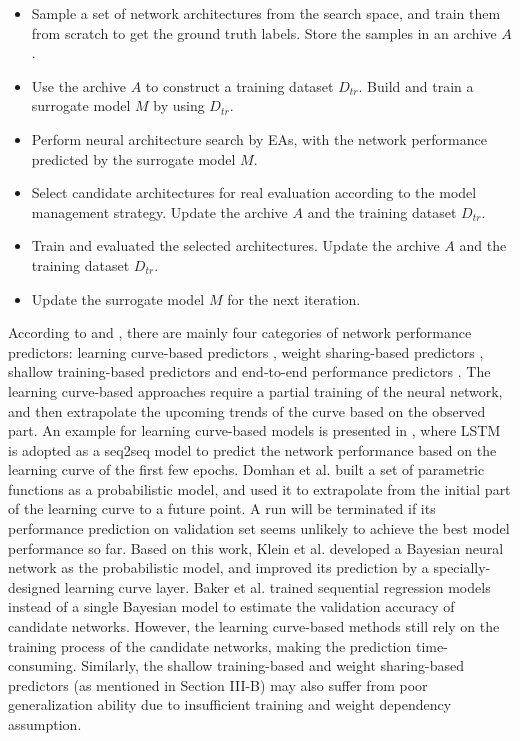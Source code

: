 \documentclass[journal]{IEEEtran}
\begin{document}
\begin{itemize}

\item Sample a set of network architectures from the search space, and train them from scratch to get the ground truth labels. Store the samples in an archive $A$.

\item Use the archive $A$ to construct a training dataset $D_{tr}$. Build and train a surrogate model $M$ by using $D_{tr}$.

\item Perform neural architecture search by EAs, with the network performance predicted by the surrogate model $M$.

\item Select candidate architectures for real evaluation according to the model management strategy. Update the archive $A$ and the training dataset $D_{tr}$.

\item Train and evaluated the selected architectures. Update the archive $A$ and the training dataset $D_{tr}$.

\item Update the surrogate model $M$ for the next iteration.

\end{itemize}


According to \cite{sun2019surrogate} and \cite{sun2021novel}, there are mainly four categories of network performance predictors: learning curve-based predictors \cite{domhan2015speeding, klein2016learning, baker2017accelerating, rawal2018nodes}, weight sharing-based predictors \cite{pham2018efficient}, shallow training-based predictors \cite{sun2019evolving} and end-to-end performance predictors \cite{sun2019surrogate, deng2017peephole, greenwood2022surrogate}. 
%
The learning curve-based approaches require a partial training of the neural network, and then extrapolate the upcoming trends of the curve based on the observed part. An example for learning curve-based models is presented in \cite{rawal2018nodes}, where LSTM is adopted as a seq2seq model to predict the network performance based on the learning curve of the first few epochs. 
Domhan et al. \cite{domhan2015speeding} built a set of parametric functions as a probabilistic model, and used it to extrapolate from the initial part of the learning curve to a future point. A run will be terminated if its performance prediction on validation set seems unlikely to achieve the best model performance so far. Based on this work, Klein et al. \cite{klein2016learning} developed a Bayesian neural network as the probabilistic model, and improved its prediction by a specially-designed learning curve layer. Baker et al. \cite{baker2017accelerating} trained sequential regression models instead of a single Bayesian model to estimate the validation accuracy of candidate networks. However, the learning curve-based methods still rely on the training process of the candidate networks, making the prediction time-consuming. Similarly, the shallow training-based and weight sharing-based predictors (as mentioned in Section III-B) may also suffer from poor generalization ability due to insufficient training and weight dependency assumption.
\end{document}

